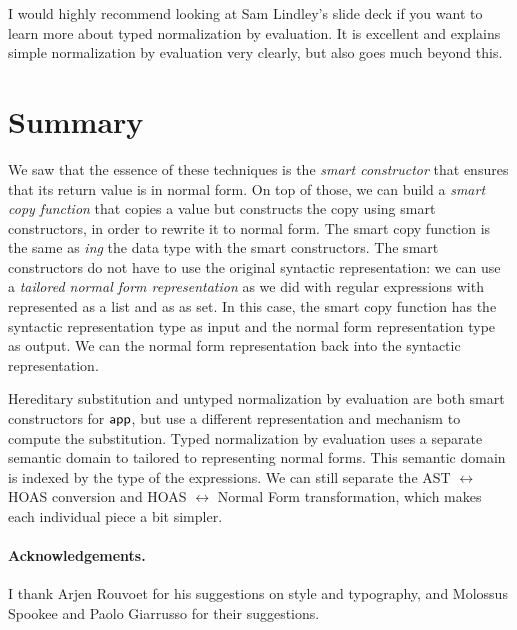 I would highly recommend looking at Sam Lindley's slide deck \cite{NbELindley2016slides} if you want to learn more about typed normalization by evaluation.
It is excellent and explains simple normalization by evaluation very clearly, but also goes much beyond this.

\section{Summary}

We saw that the essence of these techniques is the \emph{smart constructor} that ensures that its return value is in normal form.
On top of those, we can build a \emph{smart copy function}  that copies a value but constructs the copy using smart constructors, in order to rewrite it to normal form.
The smart copy function is the same as \emph{ing} the data type with the smart constructors.
The smart constructors do not have to use the original syntactic representation: we can use a \emph{tailored normal form representation} as we did with regular expressions with  represented as a list and  as as set.
In this case, the smart copy function has the syntactic representation type as input and the normal form representation type as output.
We can  the normal form representation back into the syntactic representation.

Hereditary substitution and untyped normalization by evaluation are both smart constructors for $\mathsf{app}$,
but use a different representation and mechanism to compute the substitution.
Typed normalization by evaluation uses a separate semantic domain to tailored to representing normal forms.
This semantic domain is indexed by the type of the expressions.
We can still separate the AST $\leftrightarrow$ HOAS conversion and HOAS $\leftrightarrow$ Normal Form transformation, which makes each individual piece a bit simpler.

\paragraph{Acknowledgements.} I thank Arjen Rouvoet for his suggestions on style and typography,
and Molossus Spookee and Paolo Giarrusso for their suggestions.





